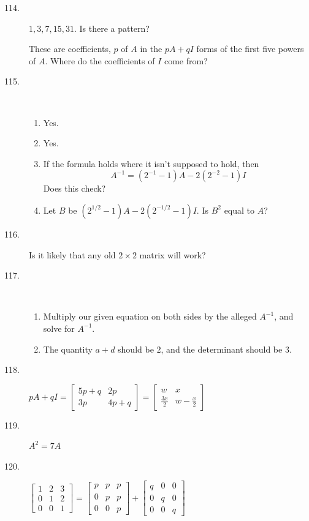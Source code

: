 \documentclass{article}
\begin{document}
\begin{description}
  \item[114.] $1, 3, 7, 15, 31$. Is there a pattern?

    These are coefficients, $p$ of $A$ in the $pA+qI$ forms of the first five powers of $A$. Where do the coefficients of $I$ come from?

  \item[115.] $\ $
    \begin{enumerate}[\hspace{1cm}(I)]
      \item Yes.
      \item Yes.
      \item If the formula holds where it isn't supposed to hold, then
        \begin{equation*}
        A^{-1} = (2^{-1}-1)A - 2(2^{-2}-1)I
        \end{equation*}
        Does this check?
      \item Let $B$ be $(2^{1/2}-1)A - 2(2^{-1/2}-1)I$. Is $B^2$ equal to $A$?
    \end{enumerate}

  \item[116.] Is it likely that any old $2 \times 2$ matrix will work?

  \item[117.] $\ $
    \begin{enumerate}[\hspace{1cm}(a)]
      \item Multiply our given equation on both sides by the alleged $A^{-1}$, and solve for $A^{-1}$.
      \item The quantity $a+d$ should be $2$, and the determinant should be $3$.
    \end{enumerate}

  \item[118.] $pA + qI = \begin{bmatrix} 5p+q & 2p \\ 3p & 4p+q \end{bmatrix}  =  \begin{bmatrix} w & x \\ \frac{3x}{2} & w-\frac{x}{2} \end{bmatrix}$

  \item[119.] $A^2 = 7A$

  \item[120.] $\begin{bmatrix} 1 & 2 & 3 \\ 0 & 1 & 2 \\ 0 & 0 & 1 \end{bmatrix}  =  \begin{bmatrix} p & p & p \\ 0 & p & p \\ 0 & 0 & p \end{bmatrix}  +  \begin{bmatrix} q & 0 & 0 \\ 0 & q & 0 \\ 0 & 0 & q \end{bmatrix}$


\end{description}
\end{document}
